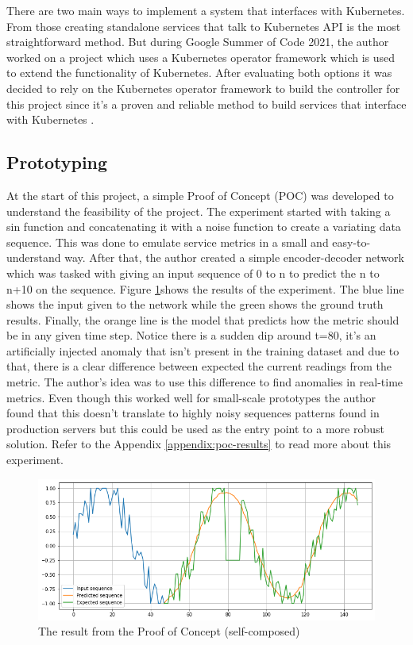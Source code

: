 There are two main ways to implement a system that interfaces with Kubernetes. From those creating standalone services that talk to Kubernetes API is the most straightforward method. But during Google Summer of Code 2021, the author worked on a project which uses a Kubernetes operator framework which is used to extend the functionality of Kubernetes. After evaluating both options it was decided to rely on the Kubernetes operator framework to build the controller for this project since it's a proven and reliable method to build services that interface with Kubernetes \citep{Introduc93:online}.

\subsection{Prototyping}

At the start of this project, a simple Proof of Concept (POC) was developed to understand the feasibility of the project. The experiment started with taking a sin function and concatenating it with a noise function to create a variating data sequence. This was done to emulate service metrics in a small and easy-to-understand way. After that, the author created a simple encoder-decoder network which was tasked with giving an input sequence of 0 to n to predict the n to n+10 on the sequence. Figure \ref{fig:poc-autoencoder}shows the results of the experiment. The blue line shows the input given to the network while the green shows the ground truth results. Finally, the orange line is the model that predicts how the metric should be in any given time step. Notice there is a sudden dip around t=80, it's an artificially injected anomaly that isn't present in the training dataset and due to that, there is a clear difference between expected the current readings from the metric. The author's idea was to use this difference to find anomalies in real-time metrics. Even though this worked well for small-scale prototypes the author found that this doesn't translate to highly noisy sequences patterns found in production servers but this could be used as the entry point to a more robust solution. Refer to the Appendix \ref{appendix:poc-results} to read more about this experiment.

\begin{figure}[H]
    \includegraphics[width=14cm]{assets/requirement-specification/poc-autoencoder.png}
    \caption{The result from the Proof of Concept (self-composed)}
    \label{fig:poc-autoencoder}
\end{figure}
